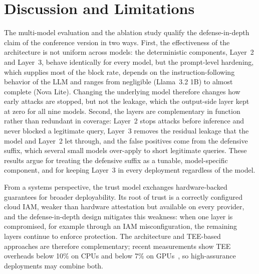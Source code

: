 \section{Discussion and Limitations}
\label{sec:discussion}

The multi-model evaluation and the ablation study qualify the defense-in-depth claim of the conference version in two ways. First, the effectiveness of the architecture is not uniform across models: the deterministic components, Layer~2 and Layer~3, behave identically for every model, but the prompt-level hardening, which supplies most of the block rate, depends on the instruction-following behavior of the LLM and ranges from negligible (Llama~3.2 1B) to almost complete (Nova Lite). Changing the underlying model therefore changes how early attacks are stopped, but not the leakage, which the output-side layer kept at zero for all nine models. Second, the layers are complementary in function rather than redundant in coverage: Layer~2 stops attacks before inference and never blocked a legitimate query, Layer~3 removes the residual leakage that the model and Layer~2 let through, and the false positives come from the defensive suffix, which several small models over-apply to short legitimate queries. These results argue for treating the defensive suffix as a tunable, model-specific component, and for keeping Layer~3 in every deployment regardless of the model.

From a systems perspective, the trust model exchanges hardware-backed guarantees for broader deployability. Its root of trust is a correctly configured cloud IAM, weaker than hardware attestation but available on every provider, and the defense-in-depth design mitigates this weakness: when one layer is compromised, for example through an IAM misconfiguration, the remaining layers continue to enforce protection. The architecture and TEE-based approaches are therefore complementary; recent measurements show TEE overheads below 10\% on CPUs and below 7\% on GPUs~\cite{teeperf2025}, so high-assurance deployments may combine both.

